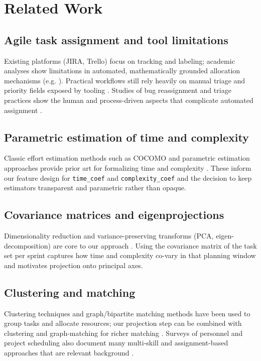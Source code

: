\documentclass[final,1p,times]{elsarticle}
\begin{document}
\section{Related Work}\label{sec:related}
\subsection{Agile task assignment and tool limitations}
Existing platforms (JIRA, Trello) focus on tracking and labeling; academic analyses show limitations in automated, mathematically grounded allocation mechanisms (e.g. \cite{jira_assignment}). Practical workflows still rely heavily on manual triage and priority fields exposed by tooling \cite{atlassian_priorities}. Studies of bug reassignment and triage practices show the human and process-driven aspects that complicate automated assignment \cite{guo2011notmybug,xuan2017bugtriage}.

\subsection{Parametric estimation of time and complexity}
Classic effort estimation methods such as COCOMO and parametric estimation approaches provide prior art for formalizing time and complexity \cite{cocomo, parametric_estimate}. These inform our feature design for \texttt{time\_coef} and \texttt{complexity\_coef} and the decision to keep estimators transparent and parametric rather than opaque.

\subsection{Covariance matrices and eigenprojections}
Dimensionality reduction and variance-preserving transforms (PCA, eigen-decomposition) are core to our approach \cite{pca2017, eigen_projection}. Using the covariance matrix of the task set per sprint captures how time and complexity co-vary in that planning window and motivates projection onto principal axes.

\subsection{Clustering and matching}
Clustering techniques and graph/bipartite matching methods have been used to group tasks and allocate resources; our projection step can be combined with clustering and graph-matching for richer matching \cite{clustering_tasks, bipartite_matching}. Surveys of personnel and project scheduling also document many multi-skill and assignment-based approaches that are relevant background \cite{WorkforceSchedSurvey2015, BurkardAssignmentBook}.
\end{document}
